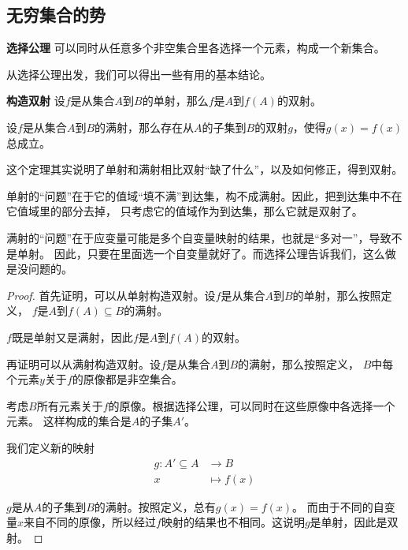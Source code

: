 \documentclass[12pt,UTF8]{ctexbook}
\begin{document}
\begin{appendix}

\chapter{无穷集合的势}

\begin{po}{\textbf{选择公理}}
    可以同时从任意多个非空集合里各选择一个元素，构成一个新集合。
\end{po}

从选择公理出发，我们可以得出一些有用的基本结论。

\begin{tm}{\textbf{构造双射}}\label{tm:a-1-0}
    设$f$是从集合$A$到$B$的单射，那么$f$是$A$到$f(A)$的双射。

    设$f$是从集合$A$到$B$的满射，那么存在从$A$的子集到$B$的双射$g$，使得$g(x) = f(x)$总成立。
\end{tm}

这个定理其实说明了单射和满射相比双射“缺了什么”，以及如何修正，得到双射。

单射的“问题”在于它的值域“填不满”到达集，构不成满射。因此，把到达集中不在它值域里的部分去掉，
只考虑它的值域作为到达集，那么它就是双射了。

满射的“问题”在于应变量可能是多个自变量映射的结果，也就是“多对一”，导致不是单射。
因此，只要在里面选一个自变量就好了。而选择公理告诉我们，这么做是没问题的。

\begin{proof}
    首先证明，可以从单射构造双射。设$f$是从集合$A$到$B$的单射，那么按照定义，
    $f$是$A$到$f(A)\subseteq B$的满射。

    $f$既是单射又是满射，因此$f$是$A$到$f(A)$的双射。

    再证明可以从满射构造双射。设$f$是从集合$A$到$B$的满射，那么按照定义，
    $B$中每个元素$y$关于$f$的原像都是非空集合。

    考虑$B$所有元素关于$f$的原像。根据选择公理，可以同时在这些原像中各选择一个元素。
    这样构成的集合是$A$的子集$A'$。

    我们定义新的映射
    \begin{align*}
        g: A'\subseteq A &\rightarrow B \\
        x &\mapsto f(x)
    \end{align*}
    
    $g$是从$A$的子集到$B$的满射。按照定义，总有$g(x) = f(x)$。
    而由于不同的自变量$x$来自不同的原像，所以经过$f$映射的结果也不相同。这说明$g$是单射，因此是双射。


\end{proof}
\end{appendix}
\end{document}
